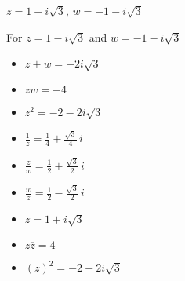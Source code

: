 {$z = 1 - i\sqrt{3}$, $w = -1 - i\sqrt{3}$}
{For   $z = 1 - i\sqrt{3}$ and $w = -1-i\sqrt{3}$

\begin{itemize}

\item $z+w = -2i\sqrt{3}$

\item $zw = -4$

\item $z^2 = -2-2i\sqrt{3}$

\item $\frac{1}{z} = \frac{1}{4} + \frac{\sqrt{3}}{4} \,i$

\item $\frac{z}{w} = \frac{1}{2} + \frac{\sqrt{3}}{2} \,i$

\item $\frac{w}{z} = \frac{1}{2} - \frac{\sqrt{3}}{2} \,i$

\item $\overline{z} = 1+i\sqrt{3}$

\item $z\overline{z} = 4$

\item $(\overline{z})^2 = -2+2i\sqrt{3}$

\end{itemize}
}
